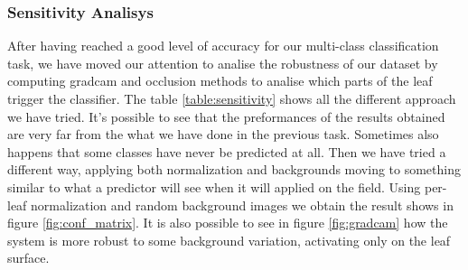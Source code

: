 \subsubsection{Sensitivity Analisys}
After having reached a good level of accuracy for our multi-class classification task, we have moved our attention to analise the robustness of our dataset by computing gradcam and occlusion methods to analise which parts of the leaf trigger the classifier. The table \ref{table:sensitivity} shows all the different approach we have tried. It's possible to see that the preformances of the results obtained are very far from the what we have done in the previous task. Sometimes also happens that some classes have never be predicted at all. Then we have tried a different way, applying both normalization and backgrounds moving to something similar to what a predictor will see when it will applied on the field. Using per-leaf normalization and random background images we obtain the result shows in figure \ref{fig:conf_matrix}. It is also possible to see in figure \ref{fig:gradcam} how the system is more robust to some background variation, activating only on the leaf surface.
